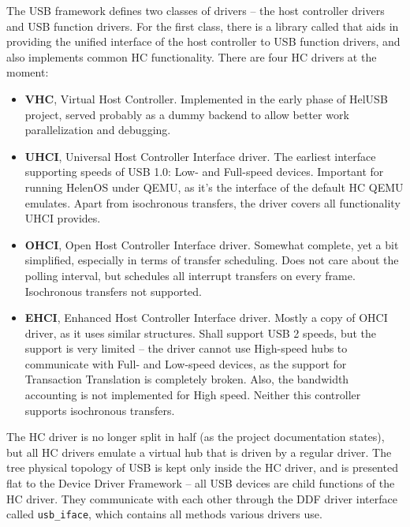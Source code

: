 The USB framework defines two classes of drivers -- the host controller drivers
and USB function drivers. For the first class, there is a library called
 that aids in providing the unified interface of the host
controller to USB function drivers, and also implements common HC
functionality. There are four HC drivers at the moment:

\begin{itemize}
\item
	\textbf{VHC}, Virtual Host Controller. Implemented in the early phase of
	HelUSB project, served probably as a dummy backend to allow better work
	parallelization and debugging.

\item
	\textbf{UHCI}, Universal Host Controller Interface driver. The earliest
	interface supporting speeds of USB 1.0: Low- and Full-speed devices.
	Important for running HelenOS under QEMU, as it's the interface of the
	default HC QEMU emulates. Apart from isochronous transfers, the driver
	covers all functionality UHCI provides.

\item
	\textbf{OHCI}, Open Host Controller Interface driver. Somewhat complete,
	yet a bit simplified, especially in terms of transfer scheduling. Does not
	care about the polling interval, but schedules all interrupt transfers on
	every frame. Isochronous transfers not supported.

\item
	\textbf{EHCI}, Enhanced Host Controller Interface driver. Mostly a copy of
	OHCI driver, as it uses similar structures. Shall support USB 2 speeds, but
	the support is very limited -- the driver cannot use High-speed hubs to
	communicate with Full- and Low-speed devices, as the support for
	Transaction Translation is completely broken. Also, the bandwidth
	accounting is not implemented for High speed. Neither this controller
	supports isochronous transfers.
\end{itemize}

The HC driver is no longer split in half (as the project documentation states),
but all HC drivers emulate a virtual hub that is driven by a regular
 driver. The tree physical topology of USB is kept only inside the
HC driver, and is presented flat to the Device Driver Framework -- all USB
devices are child functions of the HC driver. They communicate with each other
through the DDF driver interface called \texttt{usb\_iface}, which contains all
methods various drivers use.

